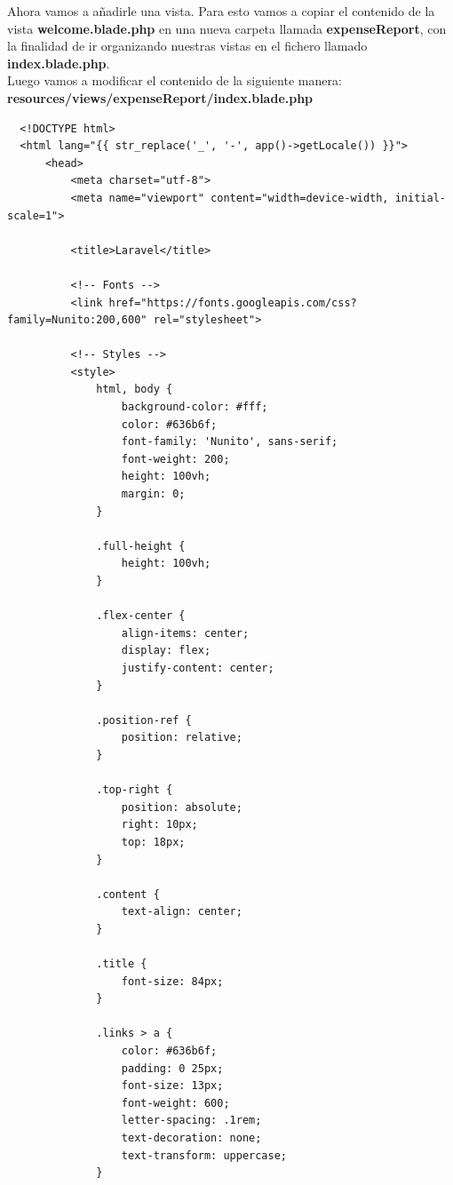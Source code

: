 \documentclass{article}
\begin{document}
Ahora vamos a añadirle una vista. Para esto vamos a copiar el contenido de la
vista \textbf{welcome.blade.php} en una nueva carpeta llamada
\textbf{expenseReport}, con la finalidad de ir organizando nuestras vistas en
el fichero llamado \textbf{index.blade.php}.\\

Luego vamos a modificar el contenido de la siguiente manera:\\

\textbf{resources/views/expenseReport/index.blade.php}
\begin{verbatim}
  <!DOCTYPE html>
  <html lang="{{ str_replace('_', '-', app()->getLocale()) }}">
      <head>
          <meta charset="utf-8">
          <meta name="viewport" content="width=device-width, initial-scale=1">

          <title>Laravel</title>

          <!-- Fonts -->
          <link href="https://fonts.googleapis.com/css?family=Nunito:200,600" rel="stylesheet">

          <!-- Styles -->
          <style>
              html, body {
                  background-color: #fff;
                  color: #636b6f;
                  font-family: 'Nunito', sans-serif;
                  font-weight: 200;
                  height: 100vh;
                  margin: 0;
              }

              .full-height {
                  height: 100vh;
              }

              .flex-center {
                  align-items: center;
                  display: flex;
                  justify-content: center;
              }

              .position-ref {
                  position: relative;
              }

              .top-right {
                  position: absolute;
                  right: 10px;
                  top: 18px;
              }

              .content {
                  text-align: center;
              }

              .title {
                  font-size: 84px;
              }

              .links > a {
                  color: #636b6f;
                  padding: 0 25px;
                  font-size: 13px;
                  font-weight: 600;
                  letter-spacing: .1rem;
                  text-decoration: none;
                  text-transform: uppercase;
              }


\end{verbatim}
\end{document}
